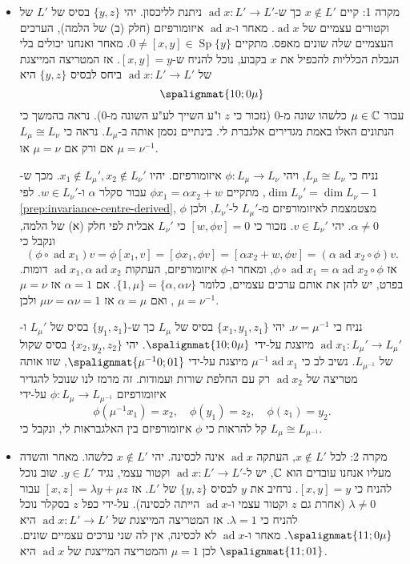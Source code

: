 \documentclass{report}
\theoremstyle{break}
\theoremstyle{MyNonumberbreak}
\DeclareMathOperator{\Sp}{Sp}
\DeclareMathOperator{\ad}{ad} %
\begin{document}
\begin{itemize}
	\item 
	מקרה 1: קיים $x \notin L'$ כך ש-$\ad x : L' \to L'$ ניתנת לליכסון. יהי $\{y, z\}$ בסיס של $L'$ של וקטורים עצמיים של $\ad x$. מאחר ו-$\ad x$ איזומורפיזם (חלק (ב) של הלמה), הערכים העצמיים שלה שונים מאפס. מתקיים $0 \neq [x, y] \in \Sp\{y\}$. מאחר ואנחנו יכולים בלי הגבלת הכלליות להכפיל את $x$ בקבוע, נוכל להניח ש-$[x, y] = y$. אז המטריצה המייצגת של $\ad x : L' \to L'$ ביחס לבסיס $\{y, z\}$ היא
	\[ \spalignmat{1 0 ; 0 \mu} \]
	עבור $\mu \in \operatorname{\mathbb{C}}$ כלשהו שונה מ-$0$ (נזכור כי $z$ ו"ע השייך לע"ע השונה מ-$0$). נראה בהמשך כי הנתונים האלו באמת מגדירים אלגברת לי. בינתיים נסמן אותה ב-$L_\mu$. נראה כי $L_\mu \cong L_\nu$ אם ורק אם $\mu = \nu$ או $\mu = \nu^{-1}$.
	
	נניח כי $L_\mu \cong L_\nu$, ויהי $\phi : L_\mu \to L_\nu$ איזומורפיזם. יהיו $x_1 \notin L_\mu', x_2 \notin L_\nu'$. מכך ש-$\dim L_\nu' = \dim L_\nu - 1$, מתקיים $\phi x_1 = \alpha x_2 + w$ עבור סקלר $\alpha$ ו-$w \in L_\nu'$. לפי \autoref*{prep:invariance-centre-derived}, $\phi$ מצטמצמת לאיזומורפיזם מ-$L_\mu'$ ל-$L_\nu'$, ולכן $\alpha \neq 0$. יהי $v \in L_\nu'$. נזכור כי $[w, \phi v] = 0$ כי $L_\nu'$ אבלית לפי חלק (א) של הלמה, ונקבל כי
	\[ (\phi \circ \ad x_1)v = \phi[x_1, v] = [\phi x_1, \phi v] = [\alpha x_2 + w, \phi v] = (\alpha \ad x_2 \circ \phi)v. \]
	אז $\phi \circ \ad x_1 = \alpha\ad x_2 \circ \phi$, ומאחר ו-$\phi$ איזומורפיזם, העתקות $\ad x_1, \alpha\ad x_2$ דומות. בפרט, יש להן את אותם ערכים עצמיים, כלומר $\{1, \mu\} = \{\alpha, \alpha\nu\}$. אם $\alpha = 1$ אז $\mu = \nu$, ואם $\alpha = \mu$ אז $\mu\nu = \alpha\nu = 1$ ולכן $\mu = \nu^{-1}$.
	
	נניח כי $\nu = \mu^{-1}$. יהי $\{x_1, y_1, z_1\}$ בסיס של $L_\mu$ כך ש-$\{y_1, z_1\}$ בסיס של $L_\mu'$ ו-$\ad x_1 : L_\mu' \to L_\mu'$ מיוצגת על-ידי $\spalignmat{1 0 ; 0 \mu}$. יהי $\{x_2, y_2, z_2\}$ בסיס שקול של $L_{\mu^{-1}}$. נשיב לב כי $\mu^{-1}\ad x_1$ מיוצגת על-ידי $\spalignmat{\mu^{-1} 0 ; 0 1}$, שזו אותה מטריצה של $\ad x_2$ רק עם החלפת שורות ועמודות. זה מרמז לנו שנוכל להגדיר איזומורפיזם $\phi : L_\mu \to L_{\mu^{-1}}$ על-ידי
	\[ \phi(\mu^{-1}x_1) = x_2, \quad \phi(y_1) = z_2, \quad \phi(z_1) = y_2. \]
	קל להראות כי $\phi$ איזומורפיזם בין האלגבראות לי, ונקבל כי $L_\mu \cong L_{\mu^{-1}}$.
	\item
	מקרה 2: לכל $x \notin L'$, העתקה $\ad x$ אינה לכסינה. יהי $x \notin L'$ כלשהו. מאחר והשדה מעליו אנחנו עובדים הוא $\operatorname{\mathbb{C}}$, יש ל-$\ad x : L' \to L'$ וקטור עצמי, נגיד $y \in L'$. שוב נוכל להניח כי $[x, y] = y$. נרחיב את $y$ לבסיס $\{y, z\}$ של $L'$. אז $[x, z] = \lambda y + \mu z$ עבור $\lambda \neq 0$ (אחרת גם $z$ וקטור עצמי ו-$\ad x$ הייתה לכסינה). על-ידי כפל $z$ בסקלר נוכל להניח כי $\lambda = 1$. אז המטריצה המייצגת של $\ad x : L' \to L'$ היא $\spalignmat{1 1 ; 0 \mu}$. מאחר ו-$\ad x$ לא לכסינה, אין לה שני ערכים עצמיים שונים. לכן $\mu = 1$ והמטריצה המייצגת של $\ad x$ היא $\spalignmat{1 1 ; 0 1}$.
	

\end{itemize}
\end{document}
